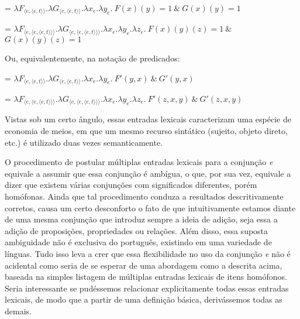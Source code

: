 \begin{exe}
	\ex {} = $\lambda F_{\langle e,\langle e,t\rangle\rangle}.\lambda G_{\langle e,\langle e,t\rangle\rangle}.\lambda x_{e}.\lambda y_{e}.\ F(x)(y)=1\ \&\ G(x)(y)=1$
\end{exe}

\begin{exe}
	\ex {} = $\lambda F_{\langle e,\langle e, \langle e,t\rangle\rangle\rangle}.\lambda G_{\langle e,\langle e, \langle e,t\rangle\rangle\rangle}.\lambda x_{e}.\lambda y_{e}.\lambda z_{e}.\ F(x)(y)(z)=1\ \& $ \\
	\hspace*{\fill} $ G(x)(y)(z)=1 $
\end{exe}



\n Ou, equivalentemente, na notação de predicados:


\begin{exe}
	\ex {} = $\lambda F_{\langle e,\langle e,t\rangle\rangle}.\lambda G_{\langle e,\langle e,t\rangle\rangle}.\lambda x_{e}.\lambda y_{e}.\ F'(y,x)\ \&\ G'(y,x)$
\end{exe}

\begin{exe}
	\ex {} = $\lambda F_{\langle e,\langle e, \langle e,t\rangle\rangle\rangle}.\lambda G_{\langle e,\langle e, \langle e,t\rangle\rangle\rangle}.\lambda x_{e}.\lambda y_{e}.\lambda z_{e}.\ F'(z,x,y)\ \&\ G'(z,x,y)$
\end{exe}

Vistas sob um certo ângulo, essas entradas lexicais caracterizam uma espécie de economia de meios, em que um mesmo recurso sintático (sujeito, objeto direto, etc.) é utilizado duas vezes semanticamente.

O procedimento de postular múltiplas entradas lexicais para a
conjun\-ção \textit{e} equivale a assumir que essa conjun\-ção é ambígua,
o que, por sua vez, equivale a dizer que existem várias
conjun\-çõ\-es com significados diferentes, porém homófonas. Ainda
que tal procedimento conduza a resultados descritivamente
corretos, causa um certo desconforto o fato de que intuitivamente
estamos diante de uma mesma conjun\-ção que introduz sempre a
ideia de adi\-ção, seja essa a adi\-ção de proposi\-çõ\-es,
propriedades ou rela\-çõ\-es. Além disso, essa suposta ambiguidade
não é exclusiva do português, existindo em uma variedade de
línguas. Tudo isso leva a crer que essa flexibilidade no uso da
conjun\-ção \textit{e} não é acidental como seria de se esperar de uma
abordagem como a descrita acima, baseada na simples listagem de
múltiplas entradas lexicais de itens homófonos. Seria interessante
se pudéssemos relacionar explicitamente todas essas entradas
lexicais, de modo que a partir de uma defini\-ção básica,
derivássemos todas as demais.


